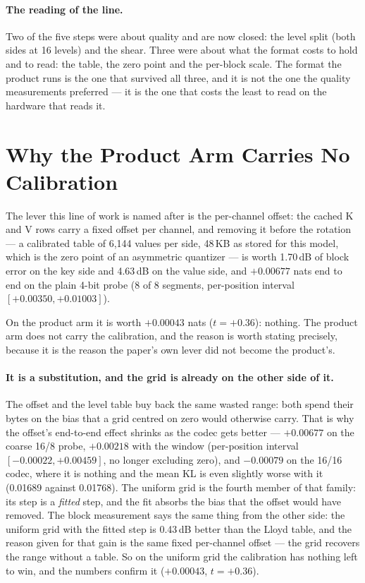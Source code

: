 \documentclass[10pt,twocolumn]{article}
\begin{document}
\paragraph{The reading of the line.} Two of the five steps were about quality and are now closed: the level
split (both sides at 16 levels) and the shear. Three were about what the format costs to hold and to read:
the table, the zero point and the per-block scale. The format the product runs is the one that survived all
three, and it is not the one the quality measurements preferred --- it is the one that costs the least to
read on the hardware that reads it.

\section{Why the Product Arm Carries No Calibration}\label{sec:calibration}

The lever this line of work is named after is the per-channel offset: the cached K and V rows carry a fixed
offset per channel, and removing it before the rotation --- a calibrated table of 6,144 values per side,
48\,KB as stored for this model, which is the zero point of an asymmetric quantizer --- is worth 1.70\,dB of
block error on the key side and 4.63\,dB on the value side, and $+0.00677$ nats end to end on the plain 4-bit
probe (8 of 8 segments, per-position interval $[+0.00350, +0.01003]$).

On the product arm it is worth $+0.00043$ nats ($t = +0.36$): nothing. The product arm does not carry the
calibration, and the reason is worth stating precisely, because it is the reason the paper's own lever did
not become the product's.

\paragraph{It is a substitution, and the grid is already on the other side of it.} The offset and the level
table buy back the same wasted range: both spend their bytes on the bias that a grid centred on zero would
otherwise carry. That is why the offset's end-to-end effect shrinks as the codec gets better --- $+0.00677$
on the coarse 16/8 probe, $+0.00218$ with the window (per-position interval $[-0.00022, +0.00459]$, no
longer excluding zero), and $-0.00079$ on the 16/16 codec, where it is nothing and the mean KL is even
slightly worse with it (0.01689 against 0.01768). The uniform grid is the fourth member of that family: its
step is a \emph{fitted} step, and the fit absorbs the bias that the offset would have removed. The block
measurement says the same thing from the other side: the uniform grid with the fitted step is 0.43\,dB
better than the Lloyd table, and the reason given for that gain is the same fixed per-channel offset --- the
grid recovers the range without a table. So on the uniform grid the calibration has nothing left to win,
and the numbers confirm it ($+0.00043$, $t = +0.36$).
\end{document}

